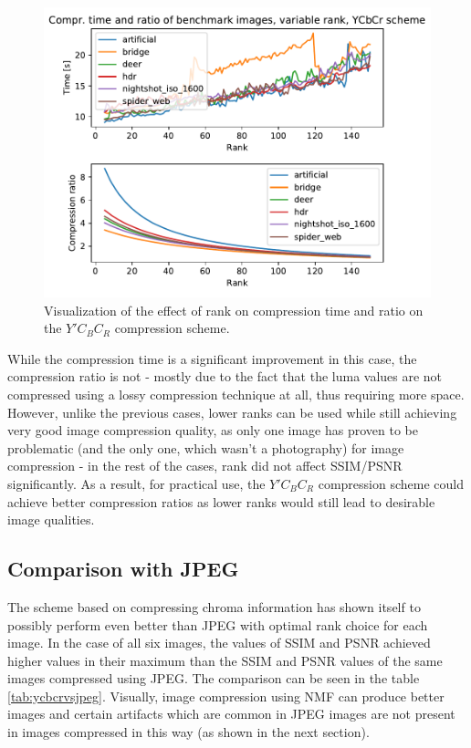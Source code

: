 \documentclass[thesis=M,english]{FITthesis}[2012/10/20]
\begin{document}
\begin{figure}[h]
  \centering
  \includegraphics[scale=0.8]{imgs/results/comprtimeratio_ycbcr}
  \caption[Compression time and ratio of $Y'C_BC_R$ compression scheme]{Visualization of
           the effect of rank on compression time and ratio
           on the $Y'C_BC_R$ compression scheme.}
  \label{fig:comprtimeratio_ycbcr}
\end{figure}

While the compression time is a significant improvement in this case, the compression ratio
is not - mostly due to the fact that the luma values are not compressed using a lossy
compression technique at all, thus requiring more space. However, unlike the previous cases,
lower ranks can be used while still achieving very good image compression quality, as
only one image has proven to be problematic (and the only one, which wasn't a photography)
for image compression - in the rest of the cases, rank did not affect SSIM/PSNR significantly.
As a result, for practical use, the $Y'C_BC_R$ compression scheme could achieve better compression
ratios as lower ranks would still lead to desirable image qualities.

\subsection{Comparison with JPEG}
The scheme based on compressing chroma information has shown itself to possibly
perform even better than JPEG with optimal rank choice for each image. In the case
of all six images, the values of SSIM and PSNR achieved higher values in their maximum than the SSIM and PSNR values
of the same images compressed using JPEG. The comparison can be seen in the table \ref{tab:ycbcrvsjpeg}.
Visually, image compression using NMF can produce better images and certain artifacts which are common
in JPEG images are not present in images compressed in this way (as shown in the next section).
\end{document}

